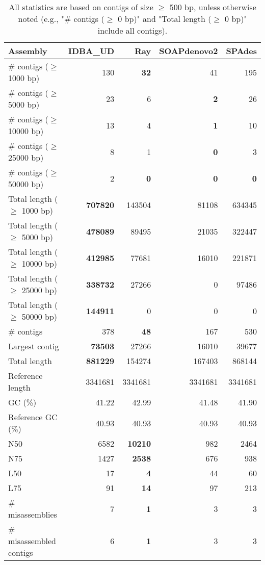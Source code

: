 \documentclass[12pt,a4paper]{article}
\begin{document}
\begin{table}[ht]
\begin{center}
\caption{All statistics are based on contigs of size $\geq$ 500 bp, unless otherwise noted (e.g., "\# contigs ($\geq$ 0 bp)" and "Total length ($\geq$ 0 bp)" include all contigs).}
\begin{tabular}{|l*{4}{|r}|}
\hline
Assembly & IDBA\_UD & Ray & SOAPdenovo2 & SPAdes \\ \hline
\# contigs ($\geq$ 1000 bp) & 130 & {\bf 32} & 41 & 195 \\ \hline
\# contigs ($\geq$ 5000 bp) & 23 & 6 & {\bf 2} & 26 \\ \hline
\# contigs ($\geq$ 10000 bp) & 13 & 4 & {\bf 1} & 10 \\ \hline
\# contigs ($\geq$ 25000 bp) & 8 & 1 & {\bf 0} & 3 \\ \hline
\# contigs ($\geq$ 50000 bp) & 2 & {\bf 0} & {\bf 0} & {\bf 0} \\ \hline
Total length ($\geq$ 1000 bp) & {\bf 707820} & 143504 & 81108 & 634345 \\ \hline
Total length ($\geq$ 5000 bp) & {\bf 478089} & 89495 & 21035 & 322447 \\ \hline
Total length ($\geq$ 10000 bp) & {\bf 412985} & 77681 & 16010 & 221871 \\ \hline
Total length ($\geq$ 25000 bp) & {\bf 338732} & 27266 & 0 & 97486 \\ \hline
Total length ($\geq$ 50000 bp) & {\bf 144911} & 0 & 0 & 0 \\ \hline
\# contigs & 378 & {\bf 48} & 167 & 530 \\ \hline
Largest contig & {\bf 73503} & 27266 & 16010 & 39677 \\ \hline
Total length & {\bf 881229} & 154274 & 167403 & 868144 \\ \hline
Reference length & 3341681 & 3341681 & 3341681 & 3341681 \\ \hline
GC (\%) & 41.22 & 42.99 & 41.48 & 41.90 \\ \hline
Reference GC (\%) & 40.93 & 40.93 & 40.93 & 40.93 \\ \hline
N50 & 6582 & {\bf 10210} & 982 & 2464 \\ \hline
N75 & 1427 & {\bf 2538} & 676 & 938 \\ \hline
L50 & 17 & {\bf 4} & 44 & 60 \\ \hline
L75 & 91 & {\bf 14} & 97 & 213 \\ \hline
\# misassemblies & 7 & {\bf 1} & 3 & 3 \\ \hline
\# misassembled contigs & 6 & {\bf 1} & 3 & 3 \\ \hline

\end{tabular}
\end{center}
\end{table}
\end{document}
